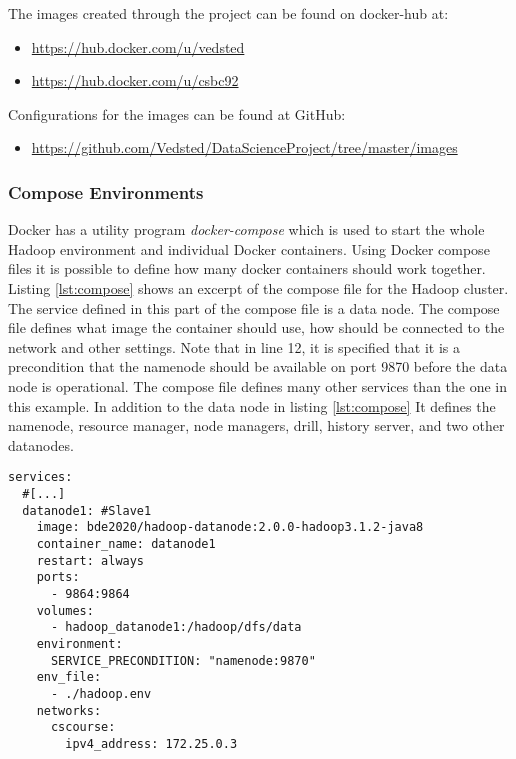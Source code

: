\documentclass[main.tex]{subfiles}
\begin{document}
The images created through the project can be found on docker-hub at:
\begin{itemize}
    \item \href{https://hub.docker.com/u/vedsted}{https://hub.docker.com/u/vedsted}
    \item \href{https://hub.docker.com/u/csbc92}{https://hub.docker.com/u/csbc92}
\end{itemize} 

Configurations for the images can be found at GitHub: 
\begin{itemize}
    \item \href{https://github.com/Vedsted/DataScienceProject/tree/master/images}{https://github.com/Vedsted/DataScienceProject/tree/master/images}
\end{itemize}
 
\subsubsection{Compose Environments}
Docker has a utility program \textit{docker-compose} which is used to start the whole Hadoop environment and individual Docker containers. Using Docker compose files it is possible to define how many docker containers should work together. Listing \ref{lst:compose} shows an excerpt of the compose file for the Hadoop cluster. The service defined in this part of the compose file is a data node. The compose file defines what image the container should use, how should be connected to the network and other settings. Note that in line 12, it is specified that it is a precondition that the namenode should be available on port 9870 before the data node is operational.
The compose file defines many other services than the one in this example. In addition to the data node in listing \ref{lst:compose} It defines the namenode, resource manager, node managers, drill, history server, and two other datanodes.

\begin{lstlisting}[style=JAVA, label={lst:compose}, caption={Part of the Docker compose file}]
services:
  #[...]
  datanode1: #Slave1
    image: bde2020/hadoop-datanode:2.0.0-hadoop3.1.2-java8
    container_name: datanode1
    restart: always
    ports:
      - 9864:9864
    volumes:
      - hadoop_datanode1:/hadoop/dfs/data
    environment:
      SERVICE_PRECONDITION: "namenode:9870"
    env_file:
      - ./hadoop.env
    networks:
      cscourse:
        ipv4_address: 172.25.0.3
\end{lstlisting}
\end{document}
